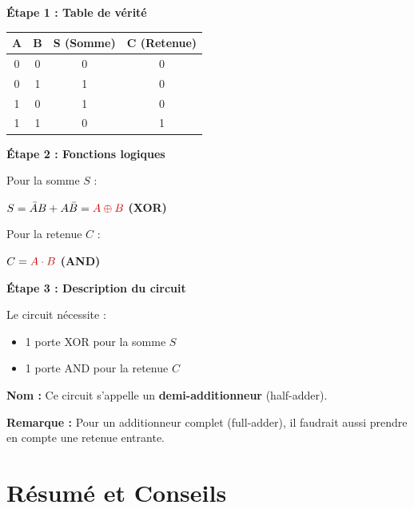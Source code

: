\documentclass[12pt,a4paper]{article}
\begin{document}
\begin{solution}
\textbf{Étape 1 : Table de vérité}

\begin{center}
\begin{tabular}{|c|c|c|c|}
\hline
\textbf{A} & \textbf{B} & \textbf{S (Somme)} & \textbf{C (Retenue)} \\
\hline
0 & 0 & 0 & 0 \\
0 & 1 & 1 & 0 \\
1 & 0 & 1 & 0 \\
1 & 1 & 0 & 1 \\
\hline
\end{tabular}
\end{center}

\textbf{Étape 2 : Fonctions logiques}

Pour la somme $S$ :

$S = \bar{A}B + A\bar{B} = \textcolor{importantrouge}{A \oplus B}$ \textbf{(XOR)}

Pour la retenue $C$ :

$C = \textcolor{importantrouge}{A \cdot B}$ \textbf{(AND)}

\textbf{Étape 3 : Description du circuit}

Le circuit nécessite :
\begin{itemize}
    \item 1 porte XOR pour la somme $S$
    \item 1 porte AND pour la retenue $C$
\end{itemize}

\textbf{Nom :} Ce circuit s'appelle un \textbf{demi-additionneur} (half-adder).

\textbf{Remarque :} Pour un additionneur complet (full-adder), il faudrait aussi prendre en compte une retenue entrante.
\end{solution}

\newpage
\section{Résumé et Conseils}
\end{document}
